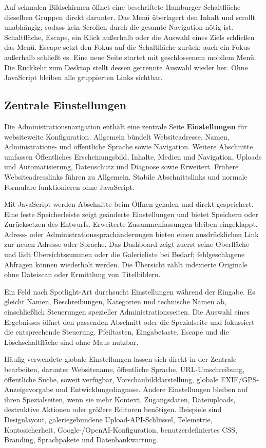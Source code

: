 \documentclass[11pt,a4paper]{article}
\begin{document}
Auf schmalen Bildschirmen öffnet eine beschriftete Hamburger-Schaltfläche
dieselben Gruppen direkt darunter. Das Menü überlagert den Inhalt und scrollt
unabhängig, sodass kein Scrollen durch die gesamte Navigation nötig ist.
Schaltfläche, Escape, ein Klick außerhalb oder die Auswahl eines Ziels schließen
das Menü. Escape setzt den Fokus auf die Schaltfläche zurück; auch ein Fokus
außerhalb schließt es. Eine neue Seite startet mit geschlossenem mobilem Menü.
Die Rückkehr zum Desktop stellt dessen getrennte Auswahl wieder her. Ohne
JavaScript bleiben alle gruppierten Links sichtbar.

\subsection{Zentrale Einstellungen}

Die Administrationsnavigation enthält eine zentrale Seite \textbf{Einstellungen}
für websiteweite Konfiguration. Allgemein bündelt Websiteadresse, Namen,
Administrations- und öffentliche Sprache sowie Navigation. Weitere Abschnitte
umfassen Öffentliches Erscheinungsbild, Inhalte, Medien und Navigation, Uploads
und Automatisierung, Datenschutz und Diagnose sowie Erweitert. Frühere
Websiteadresslinks führen zu Allgemein. Stabile Abschnittslinks und normale
Formulare funktionieren ohne JavaScript.

Mit JavaScript werden Abschnitte beim Öffnen geladen und direkt gespeichert.
Eine feste Speicherleiste zeigt geänderte Einstellungen und bietet Speichern
oder Zurücksetzen des Entwurfs. Erweiterte Zusammenfassungen bleiben
eingeklappt. Adress- oder Administrationssprachänderungen bieten einen
ausdrücklichen Link zur neuen Adresse oder Sprache. Das Dashboard zeigt zuerst
seine Oberfläche und lädt Übersichtssummen oder die Galerieliste bei Bedarf;
fehlgeschlagene Abfragen können wiederholt werden. Die Übersicht zählt
indexierte Originale ohne Dateiscan oder Ermittlung von Titelbildern.

Ein Feld nach Spotlight-Art durchsucht Einstellungen während der Eingabe. Es
gleicht Namen, Beschreibungen, Kategorien und technische Namen ab,
einschließlich Steuerungen spezieller Administrationsseiten. Die Auswahl eines
Ergebnisses öffnet den passenden Abschnitt oder die Spezialseite und fokussiert
die entsprechende Steuerung. Pfeiltasten, Eingabetaste, Escape und die
Löschschaltfläche sind ohne Maus nutzbar.

Häufig verwendete globale Einstellungen lassen sich direkt in der Zentrale
bearbeiten, darunter Websitename, öffentliche Sprache, URL-Umschreibung,
öffentliche Suche, soweit verfügbar, Vorschaubilddarstellung, globale
EXIF/GPS-Anzeigevorgabe und Entwicklungsdiagnose. Andere Einstellungen bleiben
auf ihren Spezialseiten, wenn sie mehr Kontext, Zugangsdaten, Dateiuploads,
destruktive Aktionen oder größere Editoren benötigen. Beispiele sind
Designlayout, galeriegebundene Upload-API-Schlüssel, Telemetrie,
Kontosicherheit, Google-/OpenAI-Konfiguration, benutzerdefiniertes CSS,
Branding, Sprachpakete und Datenbankwartung.
\end{document}
